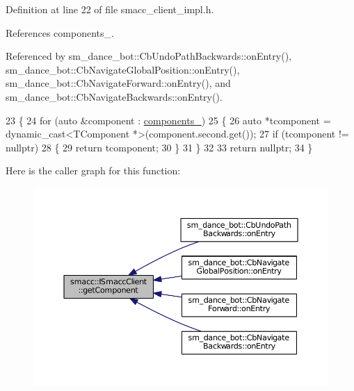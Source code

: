 Definition at line 22 of file smacc\+\_\+client\+\_\+impl.\+h.



References components\+\_\+.



Referenced by sm\+\_\+dance\+\_\+bot\+::\+Cb\+Undo\+Path\+Backwards\+::on\+Entry(), sm\+\_\+dance\+\_\+bot\+::\+Cb\+Navigate\+Global\+Position\+::on\+Entry(), sm\+\_\+dance\+\_\+bot\+::\+Cb\+Navigate\+Forward\+::on\+Entry(), and sm\+\_\+dance\+\_\+bot\+::\+Cb\+Navigate\+Backwards\+::on\+Entry().


\begin{DoxyCode}
23 \{
24     \textcolor{keywordflow}{for} (\textcolor{keyword}{auto} &component : \hyperlink{classsmacc_1_1ISmaccClient_ab983e85d296c9660f5943c1d511634ce}{components\_})
25     \{
26         \textcolor{keyword}{auto} *tcomponent = \textcolor{keyword}{dynamic\_cast<}TComponent *\textcolor{keyword}{>}(component.second.get());
27         \textcolor{keywordflow}{if} (tcomponent != \textcolor{keyword}{nullptr})
28         \{
29             \textcolor{keywordflow}{return} tcomponent;
30         \}
31     \}
32 
33     \textcolor{keywordflow}{return} \textcolor{keyword}{nullptr};
34 \}
\end{DoxyCode}


Here is the caller graph for this function\+:
\nopagebreak
\begin{figure}[H]
\begin{center}
\leavevmode
\includegraphics[width=350pt]{classsmacc_1_1ISmaccClient_adef78db601749ca63c19e74a27cb88cc_icgraph}
\end{center}
\end{figure}


